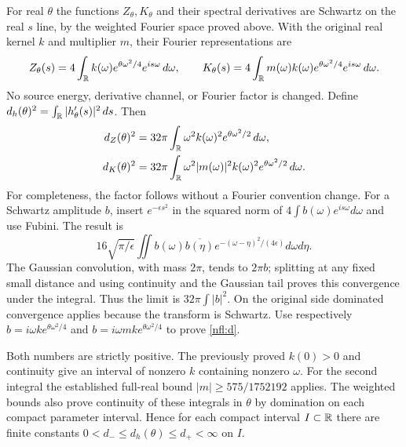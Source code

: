 For real $\theta$ the functions $Z_\theta,K_\theta$ and their spectral
derivatives are Schwartz on the real $s$ line, by the weighted Fourier
space proved above. With the original real kernel $k$ and multiplier
$m$, their Fourier representations are
\[
 Z_\theta(s)=4\int_\mathbb R k(\omega)e^{\theta\omega^2/4}e^{is\omega}\,d\omega,
 \qquad
 K_\theta(s)=4\int_\mathbb R m(\omega)k(\omega)e^{\theta\omega^2/4}
                                          e^{is\omega}\,d\omega.
\]
No source energy, derivative channel, or Fourier factor is changed.
Define $d_h(\theta)^2=\int_\mathbb R|h_\theta'(s)|^2\,ds$. Then
\begin{align}
 d_Z(\theta)^2&=32\pi\int_\mathbb R
                   \omega^2 k(\omega)^2e^{\theta\omega^2/2}\,d\omega,\notag\\
 d_K(\theta)^2&=32\pi\int_\mathbb R
        \omega^2|m(\omega)|^2 k(\omega)^2e^{\theta\omega^2/2}\,d\omega.
 \label{nfl:d}
\end{align}
For completeness, the factor follows without a Fourier convention
change. For a Schwartz amplitude $b$, insert $e^{-\epsilon s^2}$ in
the squared norm of $4\int b(\omega)e^{is\omega}d\omega$ and use Fubini.
The result is
\[
16\sqrt{\pi/\epsilon}\iint b(\omega)\overline{b(\eta)}
e^{-(\omega-\eta)^2/(4\epsilon)}d\omega d\eta.
\]
The Gaussian convolution, with mass $2\pi$, tends to $2\pi b$;
splitting at any fixed small distance and using continuity and the
Gaussian tail proves this convergence under the integral. Thus the
limit is $32\pi\int|b|^2$. On the original side dominated convergence
applies because the transform is Schwartz. Use respectively
$b=i\omega k e^{\theta\omega^2/4}$ and
$b=i\omega m k e^{\theta\omega^2/4}$ to prove \eqref{nfl:d}.

Both numbers are strictly positive. The previously proved $k(0)>0$
and continuity give an interval of nonzero $k$ containing nonzero
$\omega$. For the second integral the established full-real bound
$|m|\geq575/1752192$ applies. The weighted bounds also prove continuity
of these integrals in $\theta$ by domination on each compact parameter
interval. Hence for each compact interval $I\subset\mathbb R$ there are
finite constants $0<d_-\leq d_h(\theta)\leq d_+<\infty$ on $I$.

